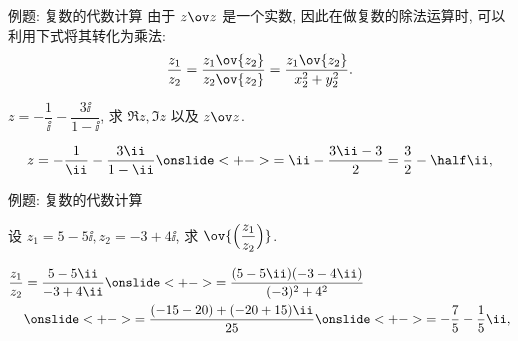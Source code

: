 \begin{frame}{例题: 复数的代数计算}
	\onslide<+->
	由于 $z\ov z$ 是一个实数,
	\onslide<+->
	因此在做复数的除法运算时, 可以利用下式将其转化为乘法:
	\[
		\dfrac{z_1}{z_2}=\dfrac{z_1\ov{z_2}}{z_2\ov{z_2}}=\dfrac{z_1\ov{z_2}}{x_2^2+y_2^2}.
	\]
	\bigdel
	\onslide<+->
	\begin{example}[nearnext]
		$z=-\dfrac1\ii-\dfrac{3\ii}{1-\ii }$, 求 $\Re z,\Im z$ 以及 $z\ov z$.
	\end{example}
	\onslide<+->
	\begin{solution}[nearprev]
		\[
			z=-\frac1\ii-\frac{3\ii}{1-\ii }
			\onslide<+->{=\ii-\frac{3\ii-3}2=\frac32-\half \ii,}
		\]
		\onslide<+->{%
		\[
			\Re z=\frac32,\quad\Im z=-\half ,\quad
			z\ov z=\Bigl(\frac32\Bigr)^2+\Bigl(-\half\Bigr)^2=\frac52.
		\]
		}
		\bigdel
	\end{solution}
\end{frame}


\begin{frame}{例题: 复数的代数计算}
	\onslide<+->
	\begin{example}[nearnext]
		设 $z_1=5-5\ii,z_2=-3+4\ii$, 求 $\ov{\Bigl(\dfrac{z_1}{z_2}\Bigr)}$.
	\end{example}
	\onslide<+->
	\begin{solution}[nearprev]
		\begin{align*}
			\frac{z_1}{z_2}&=\frac{5-5\ii}{-3+4\ii}
			\onslide<+->{=\frac{(5-5\ii)(-3-4\ii)}{(-3)^2+4^2}}\\
			&\onslide<+->{=\frac{(-15-20)+(-20+15)\ii}{25}}
			\onslide<+->{=-\frac75-\frac15\ii,}
		\end{align*}
		\onslide<+->{%
			因此 $\ov{\Bigl(\dfrac{z_1}{z_2}\Bigr)}=-\dfrac75+\dfrac15\ii$.
		}
	\end{solution}
\end{frame}






